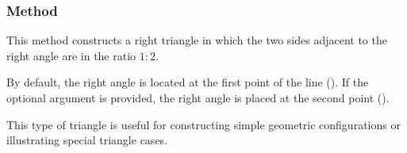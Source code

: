 \vspace{1em}
\begin{minipage}{.5\textwidth}
\begin{center}
\end{center}

\end{minipage}
\begin{minipage}{.5\textwidth}
\begin{tkzexample}
\end{tkzexample}
\end{minipage}


\subsubsection{Method } %
\label{ssub:method_imeth_line_half_swap}

This method constructs a right triangle in which the two sides adjacent to the right angle are in the ratio $1:2$.

\medskip
\noindent
By default, the right angle is located at the first point of the line (). If the optional argument  is provided, the right angle is placed at the second point ().

\medskip
\noindent
This type of triangle is useful for constructing simple geometric configurations or illustrating special triangle cases.

